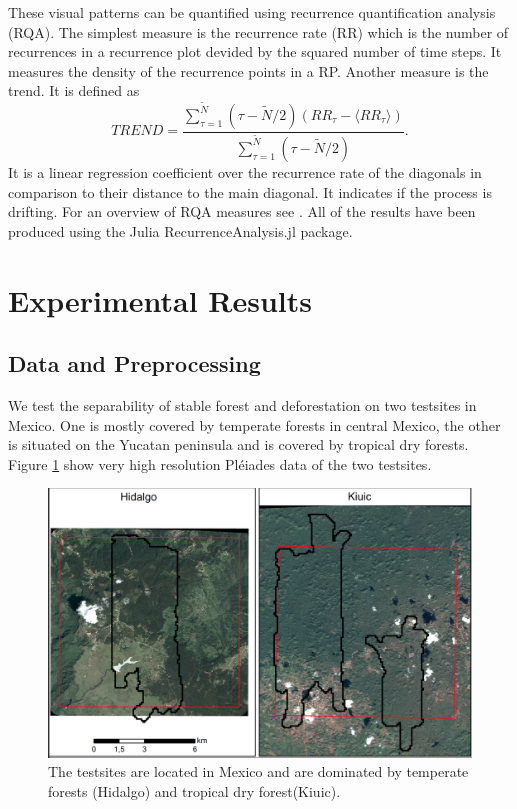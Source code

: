 \documentclass{article}
\begin{document}
These visual patterns can be quantified using recurrence quantification analysis (RQA)\cite{Zbilut}.
The simplest measure is the recurrence rate (RR) which is the number of recurrences in a recurrence plot devided by the squared number of time steps.
It measures the density of the recurrence points in a RP.
Another measure is the trend.
It is defined as
$$ TREND= \frac{\sum_{\tau=1}^{\tilde{N}}(\tau - \tilde{N}/2)(RR_\tau - \langle RR_\tau \rangle)}{\sum_{\tau=1}^{\tilde{N}}(\tau - \tilde{N}/2)}.$$
It is a linear regression coefficient over the recurrence rate of the diagonals in comparison to their distance to the main diagonal.
It indicates if the process is drifting.
For an overview of RQA measures see \cite{Marwan06}.
All of the results have been produced using the Julia RecurrenceAnalysis.jl package\cite{RQA.jl}.


\section{Experimental Results}
\subsection{Data and Preprocessing}
We test the separability of stable forest and deforestation on two testsites in Mexico.
One is mostly covered by temperate forests in central Mexico,
the other is situated on the Yucatan peninsula and is covered by tropical dry forests.
Figure \ref{testsites} show very high resolution Pléiades data of the two testsites.

\begin{figure}
  \includegraphics[width=\textwidth]{figs/SEN4REDD_testsites.png}
  \caption{The testsites are located in Mexico and are dominated by temperate forests (Hidalgo) and tropical dry forest(Kiuic).}
  \label{testsites}
\end{figure}
\end{document}
